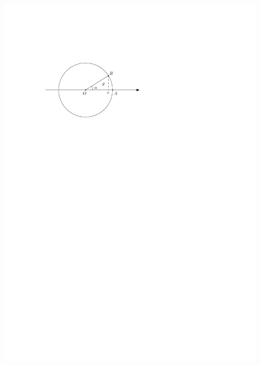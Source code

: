 \documentclass[12pt]{../../notes}
\begin{document}
\begin{figure}[t]
  \centering
  \begin{minipage}{0.48\linewidth}
    \includegraphics[scale=0.85]{acosgeomsense}~
  \end{minipage}
  \hfill
  \begin{minipage}{0.48\linewidth}

\end{minipage}
\end{figure}
\end{document}
